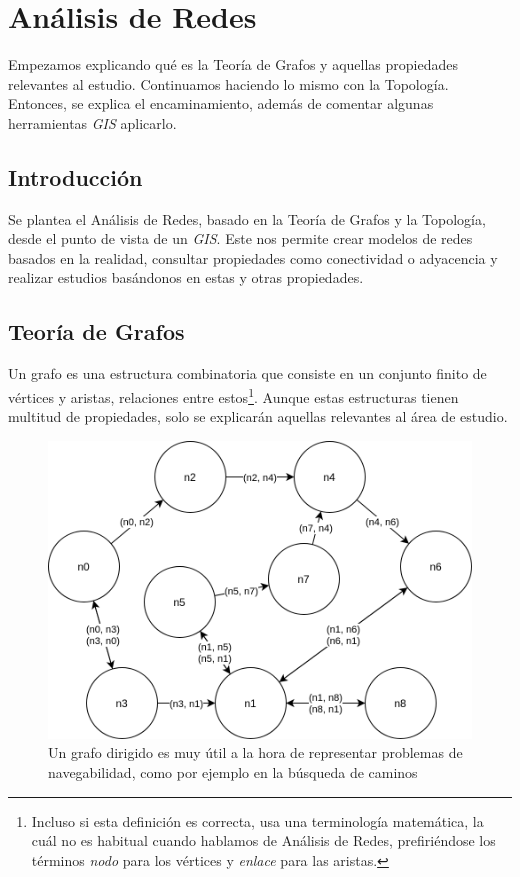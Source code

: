 \chapter{Análisis de Redes}
\label{ch:routing}

\begin{chapsummary}
	Empezamos explicando qué es la Teoría de Grafos y aquellas propiedades relevantes al estudio. Continuamos haciendo lo mismo con la Topología. Entonces, se explica el encaminamiento, además de comentar algunas herramientas \textit{GIS} aplicarlo.
\end{chapsummary}

\section*{Introducción} 
Se plantea el Análisis de Redes, basado en la Teoría de Grafos y la Topología, desde el punto de vista de un \textit{GIS}. Este nos permite crear modelos de redes basados en la realidad, consultar propiedades como conectividad o adyacencia y realizar estudios basándonos en estas y otras propiedades.
	
\section{Teoría de Grafos}
Un grafo es una estructura combinatoria \autocite[3-4]{gvaliente} que consiste en un conjunto finito de vértices y aristas, relaciones entre estos\footnote{Incluso si esta definición es correcta, usa una terminología matemática, la cuál no es habitual cuando hablamos de Análisis de Redes, prefiriéndose los términos \textit{nodo} para los vértices y \textit{enlace} para las aristas.}. 
Aunque estas estructuras tienen multitud de propiedades, solo se explicarán aquellas relevantes al área de estudio.

\begin{figure}[htbp]
	\centering
	\includegraphics[width=.9\textwidth]{img/example_graph.png}
	\caption[Navegabilidad en los grafos dirigidos]{Un grafo dirigido es muy útil a la hora de representar problemas de navegabilidad, como por ejemplo en la búsqueda de caminos}
\end{figure}

